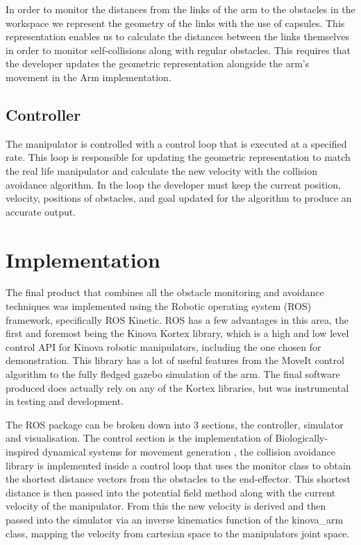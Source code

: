\documentclass[a4paper, 10pt, conference]{ieeeconf}      %
\begin{document}
In order to monitor the distances from the links of the arm to the obstacles in the workspace we represent the geometry of the links with the use of capsules. This representation enables us to calculate the distances between the links themselves in order to monitor self-collisions along with regular obstacles. This requires that the developer updates the geometric representation alongside the arm’s movement in the Arm implementation. 


\subsection{Controller} %

The manipulator is controlled with a control loop that is executed at a specified rate. This loop is responsible for updating the geometric representation to match the real life manipulator and calculate the new velocity with the collision avoidance algorithm. In the loop the developer must keep the current position, velocity, positions of obstacles, and goal updated for the algorithm to produce an accurate output. 
 
\section{Implementation} %
The final product that combines all the obstacle monitoring and avoidance techniques was implemented using the Robotic operating system (ROS) framework, specifically ROS Kinetic. ROS has a few advantages in this area, the first and foremost being the Kinova Kortex library\cite{kortex}, which is a high and low level control API for Kinova robotic manipulators, including the one chosen for demonstration. This library has a lot of useful features from the MoveIt control algorithm to the fully fledged gazebo simulation of the arm. The final software produced does actually rely on any of the Kortex libraries, but was instrumental in testing and development.

The ROS package can be broken down into 3 sections, the controller, simulator and visualisation. The control section is the implementation of Biologically-inspired dynamical systems for movement generation \cite{Hoffmann}, the collision avoidance library is implemented inside a control loop that uses the monitor class to obtain the shortest distance vectors from the obstacles to the end-effector. This shortest distance is then passed into the potential field method along with the current velocity of the manipulator. From this the new velocity is derived and then passed into the simulator via an inverse kinematics function of the kinova\_arm class, mapping the velocity from cartesian space to the manipulators joint space.
\end{document}
